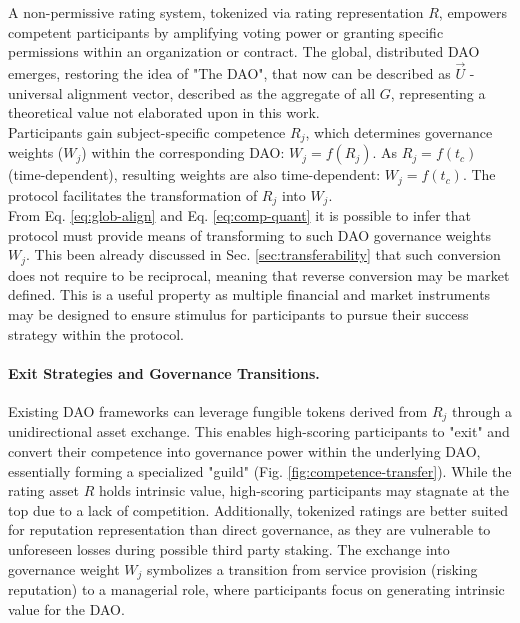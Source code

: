 \documentclass{article}
\begin{document}
\begin{CJK}{UTF8}{gbsn}
\begin{multicols}{2}
            A non-permissive rating system, tokenized via rating representation $R$, empowers competent participants by amplifying voting power or granting specific permissions within an organization or contract. The global, distributed DAO emerges, restoring the idea of "The DAO", that now can be described as $\vec{U}$ - universal alignment vector, described as the aggregate of all $G$, representing a theoretical value not elaborated upon in this work. \\
            Participants gain subject-specific competence $R_{j}$, which determines governance weights ($W_j$) within the corresponding DAO: $W_j = f(R_{j})$. As $R_j=f(t_c)$ (time-dependent), resulting weights are also time-dependent: $W_j=f(t_c)$. The protocol facilitates the transformation of $R_j$ into $W_j$.
            \\From Eq. \ref{eq:glob-align} and Eq. \ref{eq:comp-quant} it is possible to infer that protocol must provide means of transforming  to such DAO governance weights $W_j$.  This been already discussed in Sec. \ref{sec:transferability} that such conversion does not require to be reciprocal, meaning that reverse conversion may be market defined. This is a useful property as multiple financial and market instruments may be designed to ensure stimulus for participants to pursue their success strategy within the protocol.  \\ 
            \paragraph{Exit Strategies and Governance Transitions.}
            Existing DAO frameworks can leverage fungible tokens derived from $R_{j}$ through a unidirectional asset exchange. This enables high-scoring participants to "exit" and convert their competence into governance power within the underlying DAO, essentially forming a specialized "guild" (Fig. \ref{fig:competence-transfer}).
            While the rating asset $R$ holds intrinsic value, high-scoring participants may stagnate at the top due to a lack of competition. Additionally, tokenized ratings are better suited for reputation representation than direct governance, as they are vulnerable to unforeseen losses during possible third party staking. The exchange into governance weight $W_j$ symbolizes a transition from service provision (risking reputation) to a managerial role, where participants focus on generating intrinsic value for the DAO.

\end{multicols}
\end{CJK}
\end{document}
